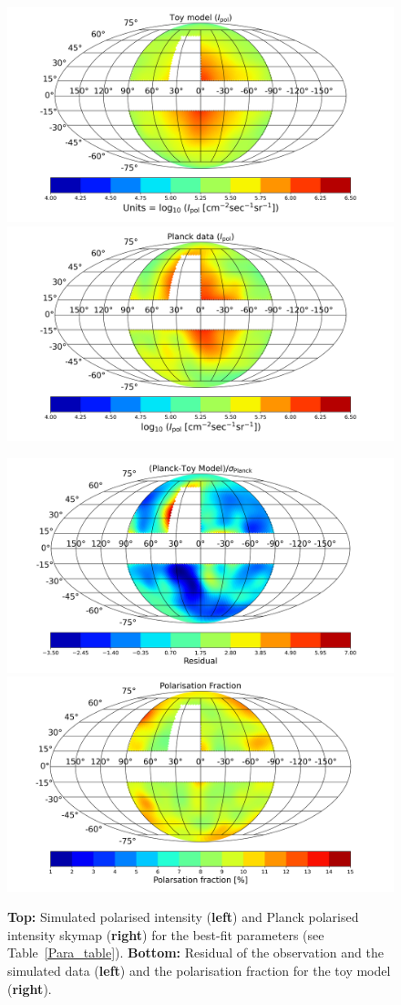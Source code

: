 \documentclass[usenatbib]{mnras}
\begin{document}
\begin{figure}
\centering
\includegraphics[width=0.49\linewidth]{Images/Feb-13-2022Ver1_Skymap_Bstr_3_Btur_6_Rmag_5_Zmag_7_norm_3.76e-13.png}
\includegraphics[width =0.49\linewidth]{Images/Feb-13-2022_Planck_Sky_Map.png}%

\includegraphics[width = 0.49\linewidth]{Images/Feb-13-2022_Residue_Bstr_3_Btur_6_Rmag_5_Zmag_7_norm_3.76e-13.png}%
\includegraphics[width =0.49\linewidth]{Images/Feb-13-2022_Pol_Frac_30GHz_Total_Skymap_Bstr_3_Btur_6_Rmag_5_Zmag_7_norm_2.61e-14.png}
\caption{\textbf{Top:} Simulated polarised intensity (\textbf{left}) and  Planck polarised intensity skymap (\textbf{right}) for the best-fit parameters (see Table~\ref{Para_table}). \textbf{Bottom:} Residual of the observation and the simulated data (\textbf{left}) and the polarisation fraction for the toy model (\textbf{right}).}
\label{fig:Skymaps}
\end{figure}
\end{document}

